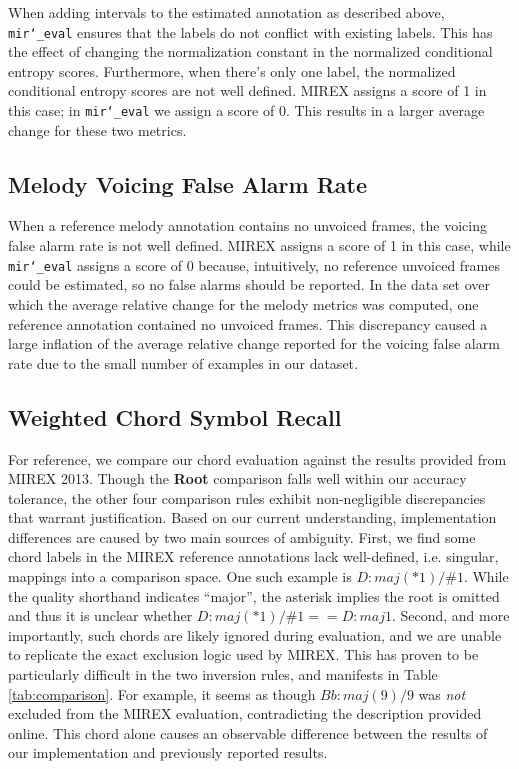 \documentclass{article}
\def\mireval{\texttt{mir\char`_eval}}
\begin{document}
When adding intervals to the estimated annotation as described above, \mireval{} ensures that the labels do not conflict with existing labels.
This has the effect of changing the normalization constant in the normalized conditional entropy scores.
Furthermore, when there's only one label, the normalized conditional entropy scores are not well defined.
MIREX assigns a score of 1 in this case; in \mireval{} we assign a score of 0.
This results in a larger average change for these two metrics.

\subsection{Melody Voicing False Alarm Rate}

When a reference melody annotation contains no unvoiced frames, the voicing false alarm rate is not well defined.
MIREX assigns a score of 1 in this case, while \mireval{} assigns a score of 0 because, intuitively, no reference unvoiced frames could be estimated, so no false alarms should be reported.
In the data set over which the average relative change for the melody metrics was computed, one reference annotation contained no unvoiced frames.
This discrepancy caused a large inflation of the average relative change reported for the voicing false alarm rate due to the small number of examples in our dataset.

\subsection{Weighted Chord Symbol Recall}
For reference, we compare our chord evaluation against the results provided from MIREX 2013.
Though the \textbf{Root} comparison falls well within our accuracy tolerance, the other four comparison rules exhibit non-negligible discrepancies that warrant justification.
Based on our current understanding, implementation differences are caused by two main sources of ambiguity.
First, we find some chord labels in the MIREX reference annotations lack well-defined, i.e. singular, mappings into a comparison space. 
One such example is $D:maj(*1)/\#1$.
While the quality shorthand indicates ``major'', the asterisk implies the root is omitted and thus it is unclear whether $D:maj(*1)/\#1==D:maj1$.
Second, and more importantly, such chords are likely ignored during evaluation, and we are unable to replicate the exact exclusion logic used by MIREX. 
This has proven to be particularly difficult in the two inversion rules, and manifests in Table \ref{tab:comparison}. 
For example, it seems as though $Bb:maj(9)/9$ was \emph{not} excluded from the MIREX evaluation, contradicting the description provided online.
This chord alone causes an observable difference between the results of our implementation and previously reported results.
\end{document}
